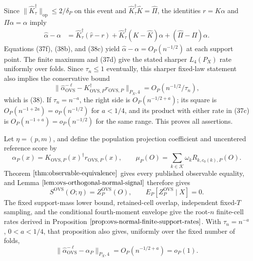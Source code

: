 Since \(\|\widehat K_\tau^\dagger\|_{\mathrm{op}}\le2/\delta_P\) on this event and \(\widehat K_\tau^\dagger\widehat K=\widehat\Pi\), the identities \(r=K\alpha\) and \(\Pi\alpha=\alpha\) imply
\[
\begin{aligned}
\widehat\alpha-\alpha
&=\widehat K_\tau^\dagger(\widehat r-r)
+\widehat K_\tau^\dagger(K-\widehat K)\alpha
+(\widehat\Pi-\Pi)\alpha.
\end{aligned}
\tag{38c}
\]
Equations (37f), (38b), and (38c) yield \(\widehat\alpha-\alpha=O_P(n^{-1/2})\) at each support point.  The finite maximum and (37d) give the stated sharper \(L_4(P_X)\) rate uniformly over folds.  Since \(\tau_n\le1\) eventually, this sharper fixed-law statement also implies the conservative bound
\[
\|\widehat\alpha_{\mathrm{OVS}}^{-\ell}
-K_{\mathrm{OVS},P}^\dagger r_{\mathrm{OVS},P}\|_{P_X,4}
=O_P(n^{-1/2}/\tau_n),
\]
which is (38).  If \(\tau_n=n^{-a}\), the right side is \(O_P(n^{-1/2+a})\); its square is \(O_P(n^{-1+2a})=o_P(n^{-1/2})\) for \(a<1/4\), and its product with either rate in (37c) is \(O_P(n^{-1+a})=o_P(n^{-1/2})\) for the same range.  This proves all assertions.

Let \(\eta=(p,m)\), and define the population projection coefficient and uncentered reference score by
\[
\alpha_P(x)=K_{\mathrm{OVS},P}(x)^\dagger r_{\mathrm{OVS},P}(x),
\qquad
\mu_P(O)=\sum_{k\in\mathcal K}\omega_k R_{k,c_0(k),P}(O).
\tag{41a}
\]
Theorem \(\ref{thm:observable-equivalence}\) gives every published observable equality, and Lemma \(\ref{lem:ovs-orthogonal-normal-signal}\) therefore gives
\[
S^{\mathrm{OVS}}(O;\eta)=Z_P^{\mathrm{OVS}}(O),
\qquad E_P[Z_P^{\mathrm{OVS}}\mid X]=0.
\tag{41b}
\]
The fixed support-mass lower bound, retained-cell overlap, independent fixed-\(T\) sampling, and the conditional fourth-moment envelope give the root-\(n\) finite-cell rates derived in Proposition \(\ref{prop:ovs-normal-finite-support-rates}\).  With \(\tau_n=n^{-a}\), \(0<a<1/4\), that proposition also gives, uniformly over the fixed number of folds,
\[
\|\widehat\alpha_{\mathrm{OVS}}^{-\ell}-\alpha_P\|_{P_X,4}
=O_P(n^{-1/2+a})=o_P(1).
\tag{41c}
\]


